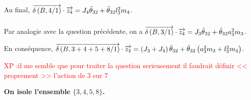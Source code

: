 \documentclass[10pt,fleqn]{article} %
\begin{document}
  Au final,  $\overrightarrow{\delta \left( {B}, {4} /{1}\right)}\cdot\overrightarrow{z_4} = J_4 \ddot{\theta}_{32}+\ddot{\theta}_{32}l_3^2 m_4 $.
  



%
%
%  
%  
%
  



\subparagraph{}%


Par analogie avec la question précédente, on a $\overrightarrow{\delta \left( {B}, {3} /{1}\right)}\cdot\overrightarrow{z_4}= J_3\ddot{\theta}_{32}+\ddot{\theta}_{32}a_3^2 m_3$.

En conséquence,  $\overrightarrow{\delta \left( {B}, {3+4+5+8} /{1}\right)}\cdot\overrightarrow{z_4} = \left(J_3+J_4\right) \ddot{\theta}_{32}+\ddot{\theta}_{32}\left( a_3^2 m_3  +l_3^2 m_4  \right)$.


\textcolor{red}{XP :il me semble que pour traiter la question serieusement il faudrait définir << proprement >> l'action de 3 sur 7}


\textbf{On isole l'ensemble $\{3,4,5,8\}$.}
\end{document}
